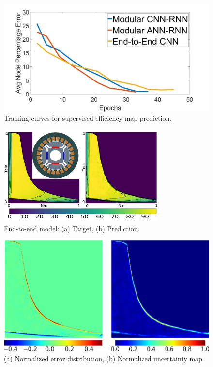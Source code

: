 \begin{figure}[h!]
    \centering
    \includegraphics[width=\textwidth]{Figures/Chp_RNN/Fig 7.png}
    \caption{Training curves for supervised efficiency map prediction.}
    \label{fig:RNN_Fig-7_trainingCurves}
\end{figure}

\begin{figure}[h!]
    \centering
    \includegraphics[width=0.75\textwidth]{Figures/Chp_RNN/Fig 8.png}
    \caption{End-to-end model: (a) Target, (b) Prediction.}
    \label{fig:RNN_Fig-8_resultsCNN}
\end{figure}

\begin{figure}[h!]
    \centering
    \includegraphics[width=\textwidth]{Figures/Chp_RNN/Fig 9.png}
    \caption{(a) Normalized error distribution, (b) Normalized uncertainty map}
    \label{fig:RNN_Fig-9_resultsMCDropout}
\end{figure}

